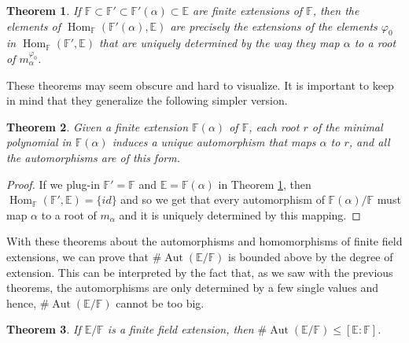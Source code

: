 \documentclass{article}
\theoremstyle{plain}
\newtheorem{theorem}{Theorem}[subsection]
\theoremstyle{definition}
\newcommand{\F}{\mathbb{F}}
\newcommand{\E}{\mathbb{E}}
\DeclareMathOperator{\Aut}{Aut}
\DeclareMathOperator{\Hom}{Hom}
\begin{document}
\begin{theorem}
\label{master theorm roots minimal and homomorphisms}
    If $\F \subset \F' \subset \F'(\alpha) \subset \E$ are finite extensions of $\F$, then the elements of $\Hom_{\F}(\F'(\alpha), \E)$ are precisely the extensions of the elements $\varphi_0$ in $\Hom_{\F}(\F', \E)$ that are uniquely determined by the way they map $\alpha$ to a root of $m_{\alpha}^{\varphi_0}$.
\end{theorem}

These theorems may seem obscure and hard to visualize. It is important to keep in mind that they generalize the following simpler version.

\begin{theorem}
\label{roots minimal polynomial and automorphisms}
    Given a finite extension $\F(\alpha)$ of $\F$, each root $r$ of the minimal polynomial in $\F(\alpha)$ induces a unique automorphism that maps $\alpha$ to $r$, and all the automorphisms are of this form.
\end{theorem}

\begin{proof}
    If we plug-in $\F' = \F$ and $\E = \F(\alpha)$ in Theorem \ref{master theorm roots minimal and homomorphisms}, then $\Hom_{\F}(\F', \E) = \{id\}$ and so we get that every automorphism of $\F(\alpha)/ \F$ must map $\alpha$ to a root of $m_{\alpha}$ and it is uniquely determined by this mapping. 
\end{proof}

With these theorems about the automorphisms and homomorphisms of finite field extensions, we can prove that $\#\Aut(\E / \F)$ is bounded above by the degree of extension. This can be interpreted by the fact that, as we saw with the previous theorems, the automorphisms are only determined by a few single values and hence, $\#\Aut(\E / \F)$ cannot be too big.

\begin{theorem}
\label{upperbound for automorphism group}
    If $\E/\F$ is a finite field extension, then $\# \Aut(\E / \F) \leq [\E : \F]$.
\end{theorem}
\end{document}
